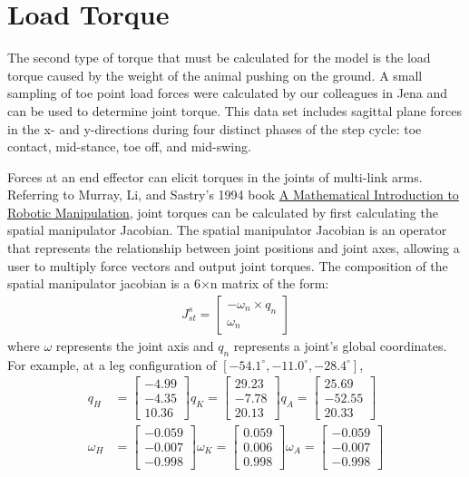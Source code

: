 \documentclass[runningheads,a4paper]{llncs}
\begin{document}
	\section{Load Torque}
	The second type of torque that must be calculated for the model is the load torque caused by the weight of the animal pushing on the ground. A small sampling of toe point load forces were calculated by our colleagues in Jena and can be used to determine joint torque. This data set includes sagittal plane forces in the x- and y-directions during four distinct phases of the step cycle: toe contact, mid-stance, toe off, and mid-swing. \par
	Forces at an end effector can elicit torques in the joints of multi-link arms. Referring to Murray, Li, and Sastry's 1994 book \underline{A Mathematical Introduction to Robotic Manipulation}\cite{murray_mathematical_1994}, joint torques can be calculated by first calculating the spatial manipulator Jacobian. The spatial manipulator Jacobian is an operator that represents the relationship between joint positions and joint axes, allowing a user to multiply force vectors and output joint torques. The composition of the spatial manipulator jacobian is a 6$\times$n matrix of the form:
	\begin{align*}
		J^{s}_{st} =
		\begin{bmatrix}
			-\omega_{n} \times q_n \\
			\omega_{n}
		\end{bmatrix}
	\end{align*}
	where $\omega$ represents the joint axis and $q_{n}$ represents a joint's global coordinates. For example, at a leg configuration of $[-54.1^{\circ}, -11.0^{\circ},-28.4^{\circ}]$,
	\begin{align*}
		q_{H} &= \begin{bmatrix}
			-4.99 \\
			-4.35 \\
			10.36
			\end{bmatrix}
		q_{K} = \begin{bmatrix}
			29.23 \\
			-7.78 \\
			20.13
			\end{bmatrix}
		q_{A} = \begin{bmatrix}
			25.69 \\
			-52.55 \\
			20.33
			\end{bmatrix} \\
		\omega_{H} &= \begin{bmatrix}
			-0.059 \\
			-0.007 \\
			-0.998
			\end{bmatrix}
		\omega_{K} = \begin{bmatrix}
			0.059 \\
			0.006 \\
			0.998
			\end{bmatrix}
		\omega_{A} = \begin{bmatrix}
			-0.059 \\
			-0.007 \\
			-0.998
			\end{bmatrix}
	\end{align*}
\end{document}
